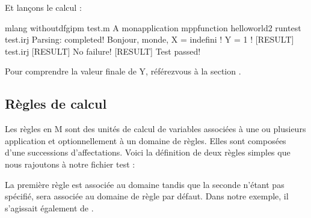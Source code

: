 \documentclass[letterpaper,10pt,french]{sphinxmanual}
\begin{document}
\sphinxAtStartPar
Et lançons le calcul :

\begin{sphinxVerbatim}[commandchars=\\\{\}]
 \PYGZdl{} mlang \PYGZhy{}\PYGZhy{}without\PYGZus{}dfgip\PYGZus{}m test.m \PYGZhy{}A mon\PYGZus{}application \PYGZhy{}\PYGZhy{}mpp\PYGZus{}function hello\PYGZus{}world2 \PYGZhy{}\PYGZhy{}run\PYGZus{}test test.irj
Parsing: completed!
Bonjour, monde, X = indefini !
Y = 1 !
[RESULT] test.irj
[RESULT] No failure!
[RESULT] Test passed!
\end{sphinxVerbatim}

\sphinxAtStartPar
Pour comprendre la valeur finale de Y, référez\sphinxhyphen{}vous à la
section {\hyperref[\detokenize{syntax:valeurs}]{}}.


\subsection{Règles de calcul}
\label{\detokenize{intro:regles-de-calcul}}
\sphinxAtStartPar
Les règles en M sont des unités de calcul de variables associées à une ou
plusieurs application et optionnellement à un domaine de règles.
Elles sont composées d’une successions d’affectations.
Voici la définition de deux règles simples que nous rajoutons à notre fichier test :

\begin{sphinxVerbatim}[commandchars=\\\{\}]
       

  
  
    

 
  
    
\end{sphinxVerbatim}

\sphinxAtStartPar
La première règle est associée au domaine  tandis que la
seconde n’étant pas spécifié, sera associée au domaine de règle par défaut.
Dans notre exemple, il s’agissait également de .
\end{document}
